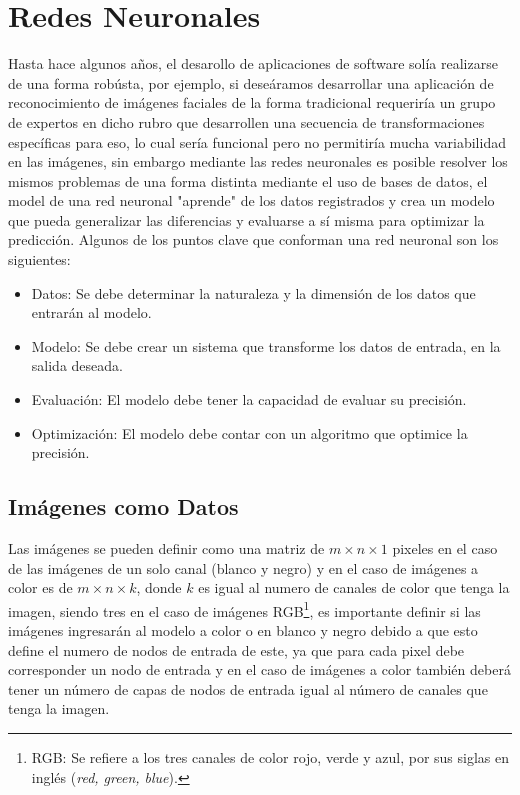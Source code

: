 
\section{Redes Neuronales}

Hasta hace algunos años, el desarollo de aplicaciones de software solía realizarse de una forma robústa, por ejemplo, si deseáramos desarrollar una aplicación de reconocimiento de imágenes faciales de la forma tradicional requeriría un grupo de expertos en dicho rubro que desarrollen una secuencia de transformaciones específicas para eso, lo cual sería funcional pero no permitiría mucha variabilidad en las imágenes, sin embargo mediante las redes neuronales es posible resolver los mismos problemas de una forma distinta mediante el uso de bases de datos, el model de una red neuronal "aprende" de los datos registrados y crea un modelo que pueda generalizar las diferencias y evaluarse a sí misma para optimizar la predicción. Algunos de los puntos clave que conforman una red neuronal son los siguientes:

\begin{itemize}
    \item Datos: Se debe determinar la naturaleza y la dimensión de los datos que entrarán al modelo.
    \item Modelo: Se debe crear un sistema que transforme los datos de entrada, en la salida deseada.
    \item Evaluación: El modelo debe tener la capacidad de evaluar su precisión.
    \item Optimización: El modelo debe contar con un algoritmo que optimice la precisión.
\end{itemize}

\subsection{Imágenes como Datos}
Las imágenes se pueden definir como una matriz de $m \times n \times 1$ pixeles en el caso de las imágenes de un solo canal (blanco y negro) y en el caso de imágenes a color es de $m \times n \times k$, donde $k$ es igual al numero de canales de color que tenga la imagen, siendo tres en el caso de imágenes RGB\footnote{RGB: Se refiere a los tres canales de color rojo, verde y azul, por sus siglas en inglés (\emph{red, green, blue}).}, es importante definir si las imágenes ingresarán al modelo a color o en blanco y negro debido a que esto define el numero de nodos de entrada de este, ya que para cada pixel debe corresponder un nodo de entrada y en el caso de imágenes a color también deberá tener un número de capas de nodos de entrada igual al número de canales que tenga la imagen.

